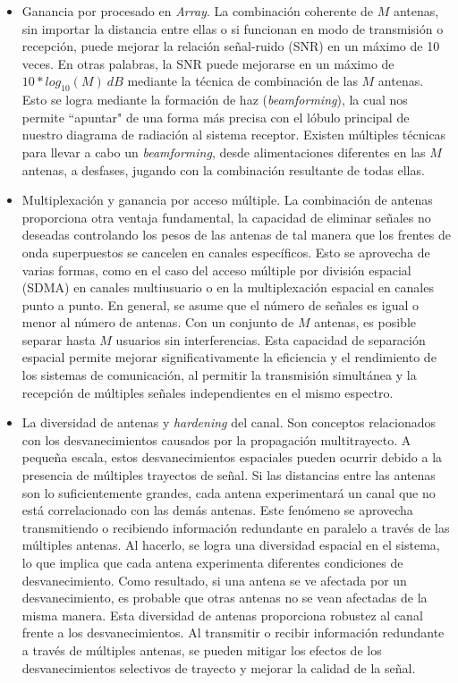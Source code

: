 \begin{itemize}
    \item Ganancia por procesado en \textit{Array}. La combinación coherente de $M$ antenas, sin importar la distancia entre ellas o si funcionan en modo de transmisión o recepción, puede mejorar la relación señal-ruido (SNR) en un máximo de 10 veces. En otras palabras, la SNR puede mejorarse en un máximo de $10*log_{10}(M)\:dB$ mediante la técnica de combinación de las $M$ antenas. Esto se logra mediante la formación de haz (\textit{beamforming}), la cual nos permite ``apuntar" de una forma más precisa con el lóbulo principal de nuestro diagrama de radiación al sistema receptor. Existen múltiples técnicas para llevar a cabo un \textit{beamforming}, desde alimentaciones diferentes en las $M$ antenas, a desfases, jugando con la combinación resultante de todas ellas.

    \item Multiplexación y ganancia por acceso múltiple. La combinación de antenas proporciona otra ventaja fundamental, la capacidad de eliminar señales no deseadas controlando los pesos de las antenas de tal manera que los frentes de onda superpuestos se cancelen en canales específicos. Esto se aprovecha de varias formas, como en el caso del acceso múltiple por división espacial (SDMA) en canales multiusuario o en la multiplexación espacial en canales punto a punto. En general, se asume que el número de señales es igual o menor al número de antenas. Con un conjunto de $M$ antenas, es posible separar hasta $M$ usuarios sin interferencias. Esta capacidad de separación espacial permite mejorar significativamente la eficiencia y el rendimiento de los sistemas de comunicación, al permitir la transmisión simultánea y la recepción de múltiples señales independientes en el mismo espectro.

    \item   La diversidad de antenas y \textit{hardening} del canal. Son conceptos relacionados con los desvanecimientos causados por la propagación multitrayecto. A pequeña escala, estos desvanecimientos espaciales pueden ocurrir debido a la presencia de múltiples trayectos de señal. Si las distancias entre las antenas son lo suficientemente grandes, cada antena experimentará un canal que no está correlacionado con las demás antenas. Este fenómeno se aprovecha transmitiendo o recibiendo información redundante en paralelo a través de las múltiples antenas. Al hacerlo, se logra una diversidad espacial en el sistema, lo que implica que cada antena experimenta diferentes condiciones de desvanecimiento. Como resultado, si una antena se ve afectada por un desvanecimiento, es probable que otras antenas no se vean afectadas de la misma manera. Esta diversidad de antenas proporciona robustez al canal frente a los desvanecimientos. Al transmitir o recibir información redundante a través de múltiples antenas, se pueden mitigar los efectos de los desvanecimientos selectivos de trayecto y mejorar la calidad de la señal. 
\end{itemize}    

